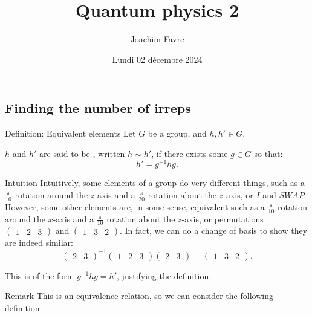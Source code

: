 \documentclass[a4paper]{article}
\title{Quantum physics 2}
\author{Joachim Favre}
\date{Lundi 02 décembre 2024}
\begin{document}
\maketitle


\subsection{Finding the number of irreps}

\begin{parag}{Definition: Equivalent elements}
    Let $G$ be a group, and $h, h' \in G$.

    $h$ and $h'$ are said to be , written $h \sim h'$, if there exists some $g \in G$ so that: 
    \[h' = g^{-1} h g.\]
     
    \begin{subparag}{Intuition}
        Intuitively, some elements of a group do very different things, such as a $\frac{\pi}{10}$ rotation around the $z$-axis and a $\frac{\pi}{20}$ rotation about the $z$-axis, or $I$ and $SWAP$. However, some other elements are, in some sense, equivalent such as a $\frac{\pi}{10}$ rotation around the $x$-axis and a $\frac{\pi}{10}$ rotation about the $z$-axis, or permutations $\begin{pmatrix} 1 & 2 & 3 \end{pmatrix} $ and $\begin{pmatrix} 1 & 3 & 2 \end{pmatrix} $. In fact, we can do a change of basis to show they are indeed similar: 
        \[\begin{pmatrix} 2 & 3 \end{pmatrix}^{-1} \begin{pmatrix} 1 & 2 & 3 \end{pmatrix} \begin{pmatrix} 2 & 3 \end{pmatrix} = \begin{pmatrix} 1 & 3 & 2 \end{pmatrix}.\]
        
        This is of the form $g^{-1} h g = h'$, justifying the definition.
    \end{subparag}

    \begin{subparag}{Remark}
        This is an equivalence relation, so we can consider the following definition. 
    \end{subparag}
\end{parag}
\end{document}
